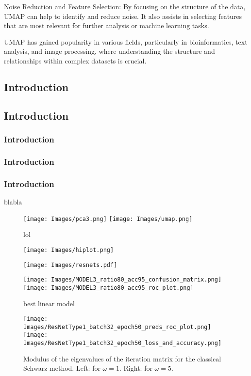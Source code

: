 \documentclass[a4paper,12pt]{article}
\begin{document}
Noise Reduction and Feature Selection: By focusing on the structure of the data, UMAP can help to identify and reduce noise. It also assists in selecting features that are most relevant for further analysis or machine learning tasks.

UMAP has gained popularity in various fields, particularly in bioinformatics, text analysis, and image processing, where understanding the structure and relationships within complex datasets is crucial.
\subsection{Introduction}
\subsection{Introduction}
\subsubsection{Introduction}
\subsubsection{Introduction}
\subsubsection{Introduction}
blabla



\begin{figure}[H]
  \centering
  \texttt{[image: Images/pca3.png]} \qquad
  \texttt{[image: Images/umap.png]}
  \caption{lol}
\end{figure}




\begin{figure}[H]
  \centering
  \texttt{[image: Images/hiplot.png]}
\end{figure}



\begin{figure}[H]
  \centering
  \texttt{[image: Images/resnets.pdf]}
\end{figure}



\begin{figure}[H]
  \centering
  \texttt{[image: Images/MODEL3\_ratio80\_acc95\_confusion\_matrix.png]} \qquad
  \texttt{[image: Images/MODEL3\_ratio80\_acc95\_roc\_plot.png]}
  \caption{best linear model}
  \label{Fig3}
\end{figure}


\begin{figure}[H]
  \centering
  \texttt{[image: Images/ResNetType1\_batch32\_epoch50\_preds\_roc\_plot.png]} \qquad
  \texttt{[image: Images/ResNetType1\_batch32\_epoch50\_loss\_and\_accuracy.png]}
  \caption{Modulus of the eigenvalues of the iteration matrix for the 
  classical Schwarz method. Left: for $\omega=1$. Right: for $\omega=5$.}
\end{figure}
\end{document}
